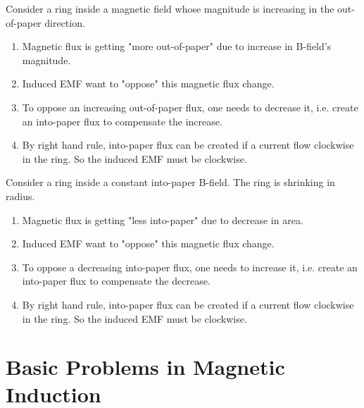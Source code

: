 \documentclass[class=article, crop=false, 12pt]{standalone}
\begin{document}
\begin{example}
    Consider a ring inside a magnetic field whose
    magnitude is increasing in the out-of-paper direction.
    \begin{enumerate}
        \item Magnetic flux is getting "more out-of-paper" due to 
        increase in B-field's magnitude.
        \item Induced EMF want to "oppose" this magnetic flux change.
        \item To oppose an increasing out-of-paper flux, one needs to decrease it,
        i.e. create an into-paper flux to compensate the increase.
        \item By right hand rule, into-paper flux can be created
        if a current flow clockwise in the ring. 
        So the induced EMF must be clockwise. 

    \end{enumerate}

\end{example}



\begin{example}
    Consider a ring inside a constant into-paper B-field.
    The ring is shrinking in radius.
    \begin{enumerate}
        \item Magnetic flux is getting "less into-paper" due to
        decrease in area.
        \item Induced EMF want to "oppose" this magnetic flux change.
        \item To oppose a decreasing into-paper flux, one needs to increase it,
        i.e. create an into-paper flux to compensate the decrease.
        \item By right hand rule, into-paper flux can be created
        if a current flow clockwise in the ring.
        So the induced EMF must be clockwise.
        
    \end{enumerate}


\end{example}
\linesep
\section{Basic Problems in Magnetic Induction}
\end{document}
